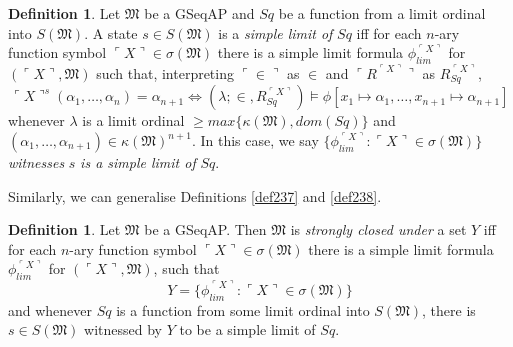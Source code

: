\documentclass[12pt, twoside]{memoir}
\numberwithin{equation}{section}
\theoremstyle{definition}
\newtheorem{defi}[thm]{Definition}
\theoremstyle{remark}
\theoremstyle{definition}
\theoremstyle{definition}
\theoremstyle{definition}
\theoremstyle{remark}
\begin{document}
\begin{defi}\label{def256}
Let $\mathfrak{M}$ be a GSeqAP and $Sq$ be a function from a limit ordinal into $S(\mathfrak{M})$. A state $s \in S(\mathfrak{M})$ is a \emph{simple limit of} $Sq$ iff for each $n$-ary function symbol $\ulcorner X \urcorner \in \sigma(\mathfrak{M})$ there is a simple limit formula $\phi_{lim}^{\ulcorner X \urcorner}$ for $(\ulcorner X \urcorner, \mathfrak{M})$ such that, interpreting $\ulcorner \in \urcorner$ as $\in$ and $\ulcorner R^{\ulcorner X \urcorner} \urcorner$ as $R_{Sq}^{\ulcorner X \urcorner}$, 
\begin{equation*}
    \ulcorner X \urcorner^s (\alpha_1, \dots, \alpha_n) = \alpha_{n+1} \iff (\lambda; \in, R_{Sq}^{\ulcorner X \urcorner}) \models \phi[x_1 \mapsto \alpha_1, \dots, x_{n+1} \mapsto \alpha_{n+1}]
\end{equation*}
whenever $\lambda$ is a limit ordinal $\geq max\{\kappa(\mathfrak{M}), dom(Sq)\}$ and $(\alpha_1, \dots, \alpha_{n+1}) \in \kappa(\mathfrak{M})^{n+1}$. In this case, we say $\{\phi_{lim}^{\ulcorner X \urcorner} : \ulcorner X \urcorner \in \sigma(\mathfrak{M})\}$ \emph{witnesses} $s$ \emph{is a simple limit of} $Sq$.
\end{defi}

Similarly, we can generalise Definitions \ref{def237} and \ref{def238}.

\begin{defi}\label{def257p}
Let $\mathfrak{M}$ be a GSeqAP. Then $\mathfrak{M}$ is \emph{strongly closed under} a set $Y$ iff for each $n$-ary function symbol $\ulcorner X \urcorner \in \sigma(\mathfrak{M})$ there is a simple limit formula $\phi_{lim}^{\ulcorner X \urcorner}$ for $(\ulcorner X \urcorner, \mathfrak{M})$, such that 
\begin{equation*}
    Y = \{\phi_{lim}^{\ulcorner X \urcorner} : \ulcorner X \urcorner \in \sigma(\mathfrak{M})\}
\end{equation*}
and whenever $Sq$ is a function from some limit ordinal into $S(\mathfrak{M})$, there is $s \in S(\mathfrak{M})$ witnessed by $Y$ to be a simple limit of $Sq$.
\end{defi}
\end{document}
